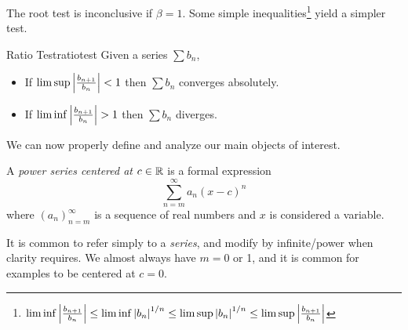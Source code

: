 
The root test is inconclusive if $\beta=1$. Some simple inequalities\footnote{$\liminf\left| \frac{b_{n+1}}{b_n}\right|\le \liminf\left| b_n\right|^{1/n}\le \limsup\left| b_n\right|^{1/n} \le\limsup\left| \frac{b_{n+1}}{b_n}\right|$} yield a simpler test.

\begin{cor}{Ratio Test}{ratiotest}
Given a series $\sum b_n$,
\begin{itemize}\itemsep0pt
  \item If $\limsup\left| \frac{b_{n+1}}{b_n}\right|<1$ then $\sum b_n$ converges absolutely.
  \item If $\liminf\nm{\frac{b_{n+1}}{b_n}}>1$ then $\sum b_n$ diverges.
\end{itemize}
\end{cor}

We can now properly define and analyze our main objects of interest.

\begin{defn}{}{}
A \emph{power series centered at $c\in\mathbb{R}$} is a formal expression
\[\sum_{n=m}^\infty a_n(x-c)^n\]
where $(a_n)_{n=m}^\infty$ is a sequence of real numbers and $x$ is considered a variable.
\end{defn}

It is common to refer simply to a \emph{series}, and modify by infinite/power when clarity requires. We almost always have $m=0$ or 1, and it is common for examples to be centered at $c=0$.


